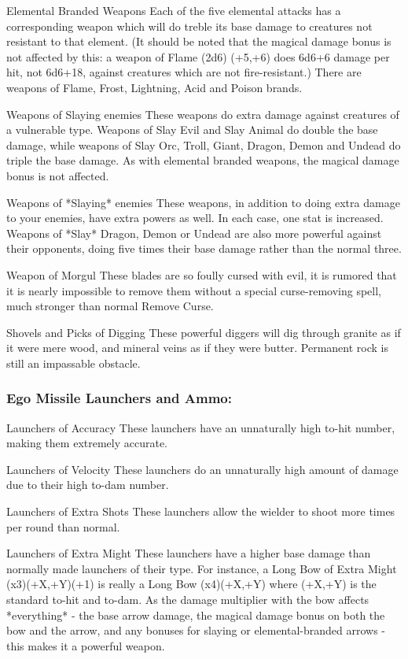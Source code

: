 Elemental Branded Weapons
     Each of the five elemental attacks has a corresponding weapon which
     will do treble its base damage to creatures not resistant to that
     element. (It should be noted that the magical damage bonus is not
     affected by this: a weapon of Flame (2d6) (+5,+6) does 6d6+6 damage
     per hit, not 6d6+18, against creatures which are not fire-resistant.)
     There are weapons of Flame, Frost, Lightning, Acid and Poison brands.

Weapons of Slaying enemies
     These weapons do extra damage against creatures of a vulnerable type.
     Weapons of Slay Evil and Slay Animal do double the base damage, while
     weapons of Slay Orc, Troll, Giant, Dragon, Demon and Undead do triple
     the base damage. As with elemental branded weapons, the magical damage
     bonus is not affected.

Weapons of *Slaying* enemies
     These weapons, in addition to doing extra damage to your enemies, have
     extra powers as well. In each case, one stat is increased. Weapons of
     *Slay* Dragon, Demon or Undead are also more powerful against their
     opponents, doing five times their base damage rather than the normal
     three.

Weapon of Morgul
     These blades are so foully cursed with evil, it is rumored that it is
     nearly impossible to remove them without a special curse-removing spell,
     much stronger than normal Remove Curse.

Shovels and Picks of Digging
     These powerful diggers will dig through granite as if it were mere wood,
     and mineral veins as if they were butter. Permanent rock is still an
     impassable obstacle.

\subsubsection{Ego Missile Launchers and Ammo:}
Launchers of Accuracy
    These launchers have an unnaturally high to-hit number, making them
    extremely accurate.

Launchers of Velocity
    These launchers do an unnaturally high amount of damage due to their
    high to-dam number.

Launchers of Extra Shots
    These launchers allow the wielder to shoot more times per round than
    normal.

Launchers of Extra Might
    These launchers have a higher base damage than normally made launchers
    of their type. For instance, a Long Bow of Extra Might (x3)(+X,+Y)(+1)
    is really a Long Bow (x4)(+X,+Y) where (+X,+Y) is the standard to-hit
    and to-dam. As the damage multiplier with the bow affects *everything*
    - the base arrow damage, the magical damage bonus on both the bow and
    the arrow, and any bonuses for slaying or elemental-branded arrows -
    this makes it a powerful weapon.

